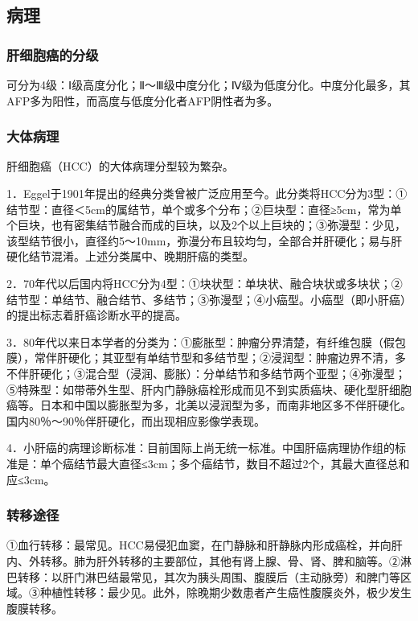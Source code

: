 \subsection{病理}

\subsubsection{肝细胞癌的分级}

可分为4级：Ⅰ级高度分化；Ⅱ～Ⅲ级中度分化；Ⅳ级为低度分化。中度分化最多，其AFP多为阳性，而高度与低度分化者AFP阴性者为多。

\subsubsection{大体病理}

肝细胞癌（HCC）的大体病理分型较为繁杂。

1．Eggel于1901年提出的经典分类曾被广泛应用至今。此分类将HCC分为3型：①结节型：直径＜5cm的属结节，单个或多个分布；②巨块型：直径≥5cm，常为单个巨块，也有密集结节融合而成的巨块，以及2个以上巨块的；③弥漫型：少见，该型结节很小，直径约5～10mm，弥漫分布且较均匀，全部合并肝硬化；易与肝硬化结节混淆。上述分类属中、晚期肝癌的类型。

2．70年代以后国内将HCC分为4型：①块状型：单块状、融合块状或多块状；②结节型：单结节、融合结节、多结节；③弥漫型；④小癌型。小癌型（即小肝癌）的提出标志着肝癌诊断水平的提高。

3．80年代以来日本学者的分类为：①膨胀型：肿瘤分界清楚，有纤维包膜（假包膜），常伴肝硬化；其亚型有单结节型和多结节型；②浸润型：肿瘤边界不清，多不伴肝硬化；③混合型（浸润、膨胀）：分单结节和多结节两个亚型；④弥漫型；⑤特殊型：如带蒂外生型、肝内门静脉癌栓形成而见不到实质癌块、硬化型肝细胞癌等。日本和中国以膨胀型为多，北美以浸润型为多，而南非地区多不伴肝硬化。国内80％～90％伴肝硬化，而出现相应影像学表现。

4．小肝癌的病理诊断标准：目前国际上尚无统一标准。中国肝癌病理协作组的标准是：单个癌结节最大直径≤3cm；多个癌结节，数目不超过2个，其最大直径总和应≤3cm。

\subsubsection{转移途径}

①血行转移：最常见。HCC易侵犯血窦，在门静脉和肝静脉内形成癌栓，并向肝内、外转移。肺为肝外转移的主要部位，其他有肾上腺、骨、肾、脾和脑等。②淋巴转移：以肝门淋巴结最常见，其次为胰头周围、腹膜后（主动脉旁）和脾门等区域。③种植性转移：最少见。此外，除晚期少数患者产生癌性腹膜炎外，极少发生腹膜转移。

